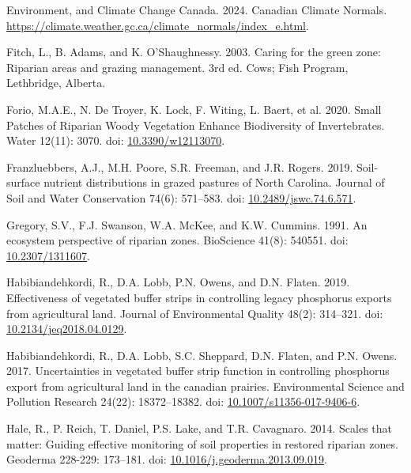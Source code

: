 \documentclass[
]{agujournal2019}
\newlength{\cslhangindent}
\newenvironment{CSLReferences}[2] %
 {\begin{list}{}{%
  \setlength{\itemindent}{0pt}
  \setlength{\leftmargin}{0pt}
  \setlength{\parsep}{0pt}
  \ifodd #1
   \setlength{\leftmargin}{\cslhangindent}
   \setlength{\itemindent}{-1\cslhangindent}
  \fi
  \setlength{\itemsep}{#2\baselineskip}}}
 {\end{list}}
\begin{document}
\begin{CSLReferences}{1}{1}
Environment, and Climate Change Canada. 2024. Canadian Climate Normals.
\url{https://climate.weather.gc.ca/climate_normals/index_e.html}.

Fitch, L., B. Adams, and K. O'Shaughnessy. 2003. Caring for the green
zone: Riparian areas and grazing management. 3rd ed. Cows; Fish Program,
Lethbridge, Alberta.

Forio, M.A.E., N. De Troyer, K. Lock, F. Witing, L. Baert, et al. 2020.
Small Patches of Riparian Woody Vegetation Enhance Biodiversity of
Invertebrates. Water 12(11): 3070. doi:
\href{https://doi.org/10.3390/w12113070}{10.3390/w12113070}.

Franzluebbers, A.J., M.H. Poore, S.R. Freeman, and J.R. Rogers. 2019.
Soil-surface nutrient distributions in grazed pastures of North
Carolina. Journal of Soil and Water Conservation 74(6): 571--583. doi:
\href{https://doi.org/10.2489/jswc.74.6.571}{10.2489/jswc.74.6.571}.

Gregory, S.V., F.J. Swanson, W.A. McKee, and K.W. Cummins. 1991. An
ecosystem perspective of riparian zones. BioScience 41(8): 540551. doi:
\href{https://doi.org/10.2307/1311607}{10.2307/1311607}.

Habibiandehkordi, R., D.A. Lobb, P.N. Owens, and D.N. Flaten. 2019.
Effectiveness of vegetated buffer strips in controlling legacy
phosphorus exports from agricultural land. Journal of Environmental
Quality 48(2): 314--321. doi:
\href{https://doi.org/10.2134/jeq2018.04.0129}{10.2134/jeq2018.04.0129}.

Habibiandehkordi, R., D.A. Lobb, S.C. Sheppard, D.N. Flaten, and P.N.
Owens. 2017. Uncertainties in vegetated buffer strip function in
controlling phosphorus export from agricultural land in the canadian
prairies. Environmental Science and Pollution Research 24(22):
18372--18382. doi:
\href{https://doi.org/10.1007/s11356-017-9406-6}{10.1007/s11356-017-9406-6}.

Hale, R., P. Reich, T. Daniel, P.S. Lake, and T.R. Cavagnaro. 2014.
Scales that matter: Guiding effective monitoring of soil properties in
restored riparian zones. Geoderma 228-229: 173--181. doi:
\href{https://doi.org/10.1016/j.geoderma.2013.09.019}{10.1016/j.geoderma.2013.09.019}.


\end{CSLReferences}
\end{document}
